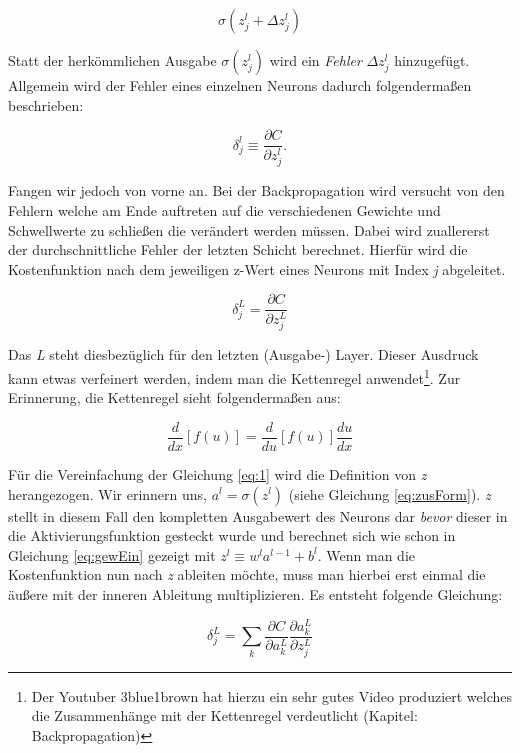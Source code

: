 \begin{equation}
\sigma(z^l_j+\Delta z^l_j)
\end{equation}

Statt der herkömmlichen Ausgabe $\sigma(z^l_j)$ wird ein \emph{Fehler} $\Delta z^l_j$ hinzugefügt. Allgemein wird der Fehler eines einzelnen Neurons dadurch folgendermaßen beschrieben:

\begin{equation}
\delta^l_j \equiv \frac{\partial C}{\partial z^l_j}.
\end{equation}

Fangen wir jedoch von vorne an. Bei der Backpropagation wird versucht von den Fehlern welche am Ende auftreten auf die verschiedenen Gewichte und Schwellwerte zu schließen die verändert werden müssen. Dabei wird zuallererst der durchschnittliche Fehler der letzten Schicht berechnet. Hierfür wird die Kostenfunktion nach dem jeweiligen z-Wert eines Neurons mit Index \emph{j} abgeleitet.

\begin{equation} \label{eq:1}
\delta^L_j = \frac{\partial C}{\partial z^L_j}
\end{equation}

Das \emph{L} steht diesbezüglich für den letzten (Ausgabe-) Layer. Dieser Ausdruck kann etwas verfeinert werden, indem man die Kettenregel anwendet\footnote{Der Youtuber 3blue1brown hat hierzu ein sehr gutes Video produziert welches die Zusammenhänge mit der Kettenregel verdeutlicht \cite{3b1b} (Kapitel: Backpropagation)}. Zur Erinnerung, die Kettenregel sieht folgendermaßen aus:

\begin{equation}
\frac{d}{{dx}}\left[ {f\left( u \right)} \right] = \frac{d}{{du}}\left[ {f\left( u \right)} \right]\frac{{du}}{{dx}}
\end{equation}

Für die Vereinfachung der Gleichung \ref{eq:1} wird die Definition von \emph{z} herangezogen. Wir erinnern uns, $a^l = \sigma(z^l)$ (siehe Gleichung \ref{eq:zusForm}). \emph{z} stellt in diesem Fall den kompletten Ausgabewert des Neurons dar \emph{bevor} dieser in die Aktivierungsfunktion gesteckt wurde und berechnet sich wie schon in Gleichung \ref{eq:gewEin} gezeigt mit ${z^l \equiv w^l a^{l-1}+b^l}$. Wenn man die Kostenfunktion nun nach \emph{z} ableiten möchte, muss man hierbei erst einmal die äußere mit der inneren Ableitung multiplizieren. Es entsteht folgende Gleichung:

\begin{equation}
\delta^L_j = \sum_k \frac{\partial C}{\partial a^L_k} \frac{\partial a^L_k}{\partial z^L_j}
\end{equation}

